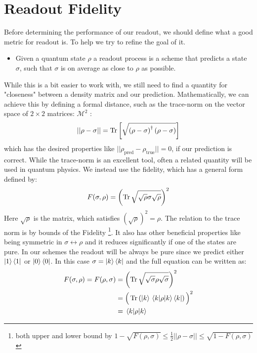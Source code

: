 \section{Readout Fidelity}
Before determining the performance of our readout, we should define what a good metric for readout is. To help we try to refine the goal of it.
\begin{itemize}
    \item Given a quantum state $\rho$ a readout process is a scheme that predicts a state $\sigma$, such that $\sigma$ is on average as close to $\rho$ as possible.
\end{itemize}
While this is a bit easier to work with, we still need to find a quantity for "closeness" between a density matrix and our prediction. Mathematically, we can achieve this by defining a formal distance, such as the trace-norm on the vector space of $2\times2$ matrices: $\mathcal{M}^2$ \cite{wilde_classical_2016}:
\begin{equation}
    ||\rho - \sigma|| = \Tr \left[\sqrt{\left(\rho - \sigma \right)^\dagger \left(\rho - \sigma \right)} \right]
\end{equation}
which has the desired properties like $||\rho_{\text{pred}} - \rho_{\text{true}}|| = 0$, if our prediction is correct. While the trace-norm is an excellent tool, often a related quantity will be used in quantum physics.  We instead use the fidelity, which has a general form defined by\cite{wilde_classical_2016}:
\begin{equation}
    F(\sigma, \rho) = \left(\Tr\sqrt{\sqrt{\rho} \sigma \sqrt{\rho}}\right)^2
\end{equation}
Here $\sqrt{\rho}$ is the matrix, which satisfies $(\sqrt{\rho})^2 = \rho$. The relation to the trace norm is by bounds of the Fidelity \footnote{both upper and lower bound by $1 - \sqrt{F(\rho, \sigma)} \leq \frac{1}{2} ||\rho - \sigma|| \leq \sqrt{1 - F(\rho, \sigma)}$ \cite{wilde_classical_2016}}.  It also has other beneficial properties like being  symmetric in $\sigma \leftrightarrow \rho$ and it reduces significantly if one of the states are pure. In our schemes the readout will be always be pure since we predict either $\ket{1}\bra{1}$ or $\ket{0}\bra{0}$. In this case $\sigma = \ket{k}\bra{k}$ and the full equation can be written as:
\begin{align*}
    F(\sigma, \rho) = F(\rho, \sigma) &= \left(\Tr\sqrt{\sqrt{\sigma} \rho \sqrt{\sigma}}\right)^2 \\
    &= \Big(\Tr \left(\ket{k}\mel{k}{\rho}{k}\bra{k}\right)\Big)^2\\
    &= \mel{k}{\rho}{k}
\end{align*}
